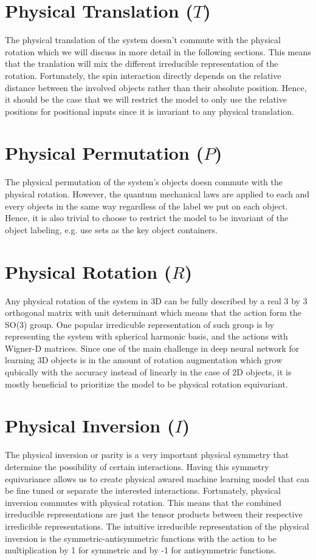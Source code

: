 \documentclass[reprint, 10pt]{revtex4-2}
\begin{document}
\section{Physical Translation ($T$)}
The physical translation of the system doesn't commute with the physical rotation which we will discuss in more
detail in the following sections. This means that the tranlation will mix the different irreducible representation of 
the rotation. Fortunately, the spin interaction directly depends on the relative distance between the involved objects
rather than their absolute position. Hence, it should be the case that we will restrict the model to only use the relative 
positions for positional inputs since it is invariant to any physical translation.

\section{Physical Permutation ($P$)}
The physical permutation of the system's objects doesn commute with the physical rotation. However, the quantum
mechanical laws are applied to each and every objects in the same way regardless of the label we put on each object.
Hence, it is also trivial to choose to restrict the model to be invariant of the object labeling, e.g. use sets as the
key object containers.

\section{Physical Rotation ($R$)}
Any physical rotation of the system in 3D can be fully described by a real 3 by 3 orthogonal matrix with unit determinant
which means that the action form the SO(3) group. One popular irredicuble representation of such group is by representing
the system with spherical harmonic basis, and the actions with Wigner-D matrices. Since one of the main challenge in 
deep neural network for learning 3D objects is in the amount of rotation augmentation which grow qubically with the 
accuracy instead of linearly in the case of 2D objects, it is mostly beneficial to prioritize the model to be physical
rotation equivariant.

\section{Physical Inversion ($I$)}
The physical inversion or parity is a very important physical symmetry that determine the possibility of certain interactions.
Having this symmetry equivariance allows us to create physical awared machine learning model that can be fine tuned or separate
the interested interactions. Fortunately, physical inversion commutes with physical rotation. This means that the combined
irreducible representations are just the tensor products between their respective irredicible representations. The intuitive
irreducible representation of the physical inversion is the symmetric-antisymmetric functions with the action to be multiplication
by 1 for symmetric and by -1 for antisymmetric functions.
\end{document}
